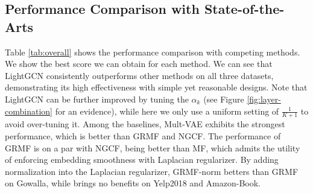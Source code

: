 \documentclass[sigconf]{acmart}
\theoremstyle{definition}
\begin{document}
\subsection{Performance Comparison with State-of-the-Arts}\label{ss:exp-SOTA}
Table \ref{tab:overall} shows the performance comparison with competing methods. We show the best score we can obtain for each method. We can see that LightGCN consistently outperforms other methods on all three datasets, demonstrating its high effectiveness with simple yet reasonable designs. Note that LightGCN can be further improved by tuning the $\alpha_k$ (see Figure \ref{fig:layer-combination} for an evidence), while here we only use a uniform setting of $\frac{1}{K+1}$ to avoid over-tuning it. Among the baselines, Mult-VAE exhibits the strongest performance, which is better than GRMF and NGCF. 
The performance of GRMF is on a par with NGCF, being better than MF, which admits the utility of enforcing embedding smoothness with Laplacian regularizer. 
By adding normalization into the Laplacian regularizer, GRMF-norm betters than GRMF on Gowalla, while brings no benefits on Yelp2018 and Amazon-Book. 



\begin{table}[h]
\caption{The comparison of overall performance among LightGCN and competing methods.}\vspace{-8pt}
\label{tab:overall}
\end{table}
\end{document}
